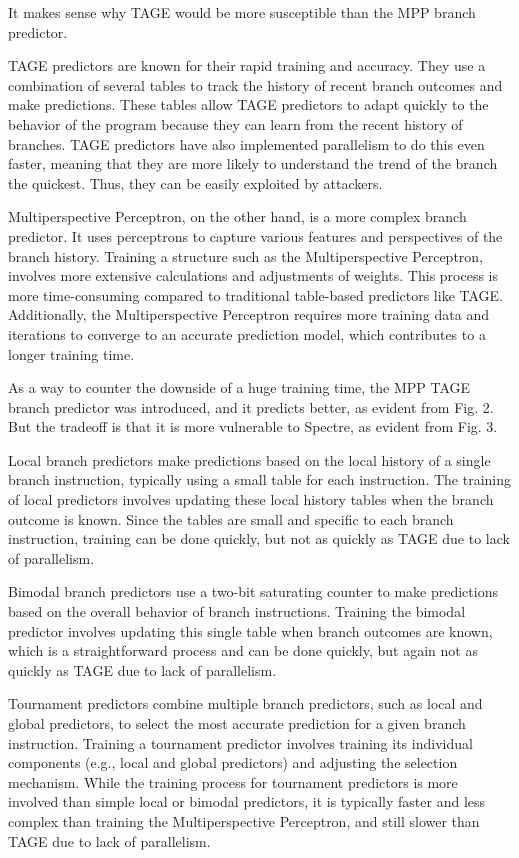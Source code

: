 \documentclass[twocolumn,showpacs,%
  nofootinbib,aps,superscriptaddress,%
  eqsecnum,prd,notitlepage,showkeys,10pt]{revtex4-1}
\begin{document}
It makes sense why TAGE would be more susceptible than the MPP branch predictor. 

TAGE predictors are known for their rapid training and accuracy. They use a combination of several tables to track the history of recent branch outcomes and make predictions. These tables allow TAGE predictors to adapt quickly to the behavior of the program because they can learn from the recent history of branches. TAGE predictors have also implemented parallelism to do this even faster, meaning that they are more likely to understand the trend of the branch the quickest. Thus, they can be easily exploited by attackers.\cite{seznec2006case}

Multiperspective Perceptron, on the other hand, is a more complex branch predictor. It uses perceptrons to capture various features and perspectives of the branch history. Training a structure such as the Multiperspective Perceptron, involves more extensive calculations and adjustments of weights. This process is more time-consuming compared to traditional table-based predictors like TAGE. Additionally, the Multiperspective Perceptron requires more training data and iterations to converge to an accurate prediction model, which contributes to a longer training time.\cite{jimenez2001dynamic}

As a way to counter the downside of a huge training time, the MPP TAGE branch predictor was introduced, and it predicts better, as evident from Fig. 2. But the tradeoff is that it is more vulnerable to Spectre, as evident from Fig. 3.

Local branch predictors make predictions based on the local history of a single branch instruction, typically using a small table for each instruction. The training of local predictors involves updating these local history tables when the branch outcome is known. Since the tables are small and specific to each branch instruction, training can be done quickly, but not as quickly as TAGE due to lack of parallelism.\cite{mcfarling1993combining}

Bimodal branch predictors use a two-bit saturating counter to make predictions based on the overall behavior of branch instructions. Training the bimodal predictor involves updating this single table when branch outcomes are known, which is a straightforward process and can be done quickly, but again not as quickly as TAGE due to lack of parallelism.\cite{peress2008historical}

Tournament predictors combine multiple branch predictors, such as local and global predictors, to select the most accurate prediction for a given branch instruction. Training a tournament predictor involves training its individual components (e.g., local and global predictors) and adjusting the selection mechanism. While the training process for tournament predictors is more involved than simple local or bimodal predictors, it is typically faster and less complex than training the Multiperspective Perceptron, and still slower than TAGE due to lack of parallelism.\cite{mcfarling1993combining}
\end{document}
